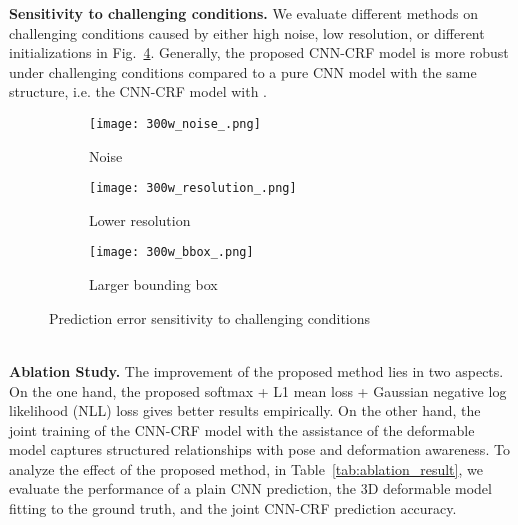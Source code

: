 \documentclass{article}
\begin{document}
\textbf{Sensitivity to challenging conditions. } We evaluate different methods on challenging conditions caused by either high noise, low resolution, or different initializations in Fig.~\ref{fig:challenging}. 
Generally, the proposed CNN-CRF model is more robust under challenging conditions compared to a pure CNN model with the same structure, i.e. the CNN-CRF model with .
  \begin{figure}[ht]
  \begin{center}
    \begin{subfigure}{0.3\textwidth}
      \begin{center}
      \texttt{[image: 300w\_noise\_.png]}
      \end{center}
      \caption{Noise}
      \label{fig:noise}
    \end{subfigure}
    \begin{subfigure}{0.3\textwidth}
      \begin{center}
      \texttt{[image: 300w\_resolution\_.png]}
      \end{center}
      \caption{Lower resolution}
      \label{fig:resolution}
    \end{subfigure}
    \begin{subfigure}{0.3\textwidth}
      \begin{center}
      \texttt{[image: 300w\_bbox\_.png]}
      \end{center}
      \caption{Larger bounding box}
      \label{fig:bbox}
    \end{subfigure}
  \caption{Prediction error sensitivity to challenging conditions}
  \label{fig:challenging}
  \end{center}
  \end{figure}\\
\textbf{Ablation Study. } The improvement of the proposed method lies in two aspects. On the one hand, the proposed softmax + L1 mean loss + Gaussian negative log likelihood (NLL) loss gives better results empirically. On the other hand, the joint training of the CNN-CRF model with the assistance of the deformable model captures structured relationships with pose and deformation awareness.
To analyze the effect of the proposed method, in Table~\ref{tab:ablation_result}, we evaluate the performance of a plain CNN prediction, the 3D deformable model fitting to the ground truth, and the joint CNN-CRF prediction accuracy.
\end{document}
